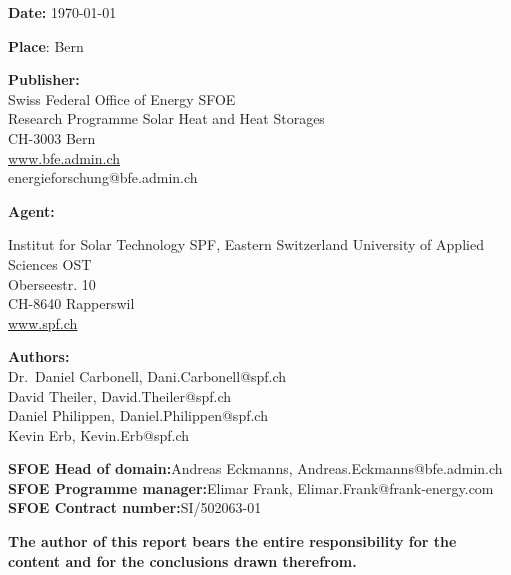 \begin{flushleft}
\vspace*{\fill}

\textbf{Date:} \today \\
\vspace{4mm}

\textbf{Place}: Bern\\
\vspace{4mm}

\textbf{Publisher:} \\
\vspace{1mm}
Swiss Federal Office of Energy SFOE \\
Research Programme Solar Heat and Heat Storages \\
CH-3003 Bern \\
\underline{www.bfe.admin.ch}\\
energieforschung@bfe.admin.ch\\

\vspace{4mm}

\textbf{Agent:}\\
\vspace{1mm}

Institut for Solar Technology SPF, Eastern Switzerland University of Applied Sciences OST\\
Oberseestr. 10 \\
CH-8640 Rapperswil \\
\underline{www.spf.ch} \\
\vspace{4mm}

\textbf{Authors:}\\
\vspace{1mm}
Dr.~Daniel Carbonell, Dani.Carbonell@spf.ch \\
David Theiler, David.Theiler@spf.ch \\
Daniel Philippen, Daniel.Philippen@spf.ch  \\
Kevin Erb, Kevin.Erb@spf.ch \\

\vspace{5mm}

\textbf{SFOE Head of domain:}\phantom{xxxxxx}Andreas Eckmanns, Andreas.Eckmanns@bfe.admin.ch\\
\textbf{SFOE Programme manager:}\phantom{x}Elimar Frank, Elimar.Frank@frank-energy.com\\
\textbf{SFOE Contract number:}\phantom{xxxxx}SI/502063-01
\vspace{6mm}

\textbf{The author of this report bears the entire responsibility for the content and for the conclusions
drawn therefrom.}

\end{flushleft}